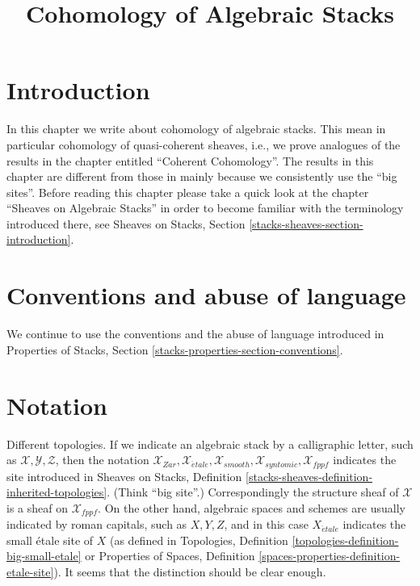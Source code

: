 

%


\title{Cohomology of Algebraic Stacks}

\maketitle

\label{section-phantom}

\tableofcontents




\section{Introduction}
\label{section-introduction}

\noindent
In this chapter we write about cohomology of algebraic stacks.
This mean in particular cohomology of quasi-coherent sheaves, i.e.,
we prove analogues of the results in the chapter entitled
``Coherent Cohomology''. The results in this chapter are different
from those in \cite{LM-B} mainly because we consistently use the
``big sites''. Before reading this chapter please take a quick look at
the chapter ``Sheaves on Algebraic Stacks'' in order to become
familiar with the terminology introduced there, see
Sheaves on Stacks, Section \ref{stacks-sheaves-section-introduction}.



\section{Conventions and abuse of language}
\label{section-conventions}

\noindent
We continue to use the conventions and the abuse of language
introduced in
Properties of Stacks, Section \ref{stacks-properties-section-conventions}.











\section{Notation}
\label{section-notation}

\noindent
Different topologies. If we indicate an algebraic stack by a calligraphic
letter, such as $\mathcal{X}, \mathcal{Y}, \mathcal{Z}$, then the notation
$\mathcal{X}_{Zar}, \mathcal{X}_{\acute{e}tale}, \mathcal{X}_{smooth},
\mathcal{X}_{syntomic}, \mathcal{X}_{fppf}$ indicates the site introduced
in
Sheaves on Stacks, Definition
\ref{stacks-sheaves-definition-inherited-topologies}.
(Think ``big site''.) Correspondingly the structure sheaf of
$\mathcal{X}$ is a sheaf on $\mathcal{X}_{fppf}$.
On the other hand, algebraic spaces and schemes
are usually indicated by roman capitals, such as $X, Y, Z$, and in this case
$X_{\acute{e}tale}$ indicates the small \'etale site of $X$ (as
defined in
Topologies, Definition
\ref{topologies-definition-big-small-etale}
or
Properties of Spaces, Definition
\ref{spaces-properties-definition-etale-site}).
It seems that the distinction should be clear enough.

